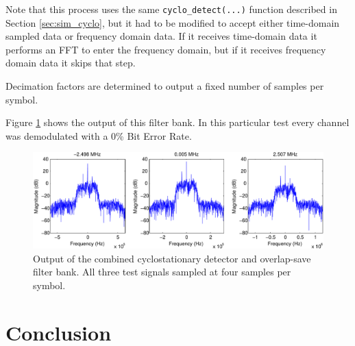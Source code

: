 \documentclass[12pt]{report}
\begin{document}
Note that this process uses the same \texttt{cyclo\_detect(...)} function 
described in Section \ref{sec:sim_cyclo}, but it had to be modified to accept
either time-domain sampled data or frequency domain data. If it receives
time-domain data it performs an FFT to enter the frequency domain, but if it
receives frequency domain data it skips that step.

Decimation factors are determined to output a fixed number of samples per symbol.

Figure \ref{fig:cyclo_os_results} shows the output of this filter bank. In this
particular test every channel was demodulated with a 0\% Bit Error Rate.

\begin{figure}[bh!]
    \includegraphics[width=\textwidth]{cyclo_os_results}%
\caption{Output of the combined cyclostationary detector and overlap-save filter bank. All three test signals sampled at four samples per symbol.}
\label{fig:cyclo_os_results}
\end{figure}

\chapter{Conclusion}
\label{sec:conclusion}


%
%

%

\end{document}

